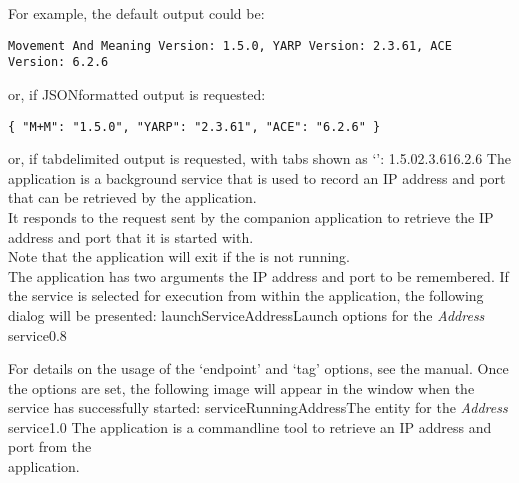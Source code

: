 \insertFullUtilityParameters{}
For example, the default output could be:
\outputBegin
\begin{verbatim}
Movement And Meaning Version: 1.5.0, YARP Version: 2.3.61, ACE Version: 6.2.6
\end{verbatim}
\outputEnd{}
or, if JSON\longDash{}formatted output is requested:
\outputBegin
\begin{verbatim}
{ "M+M": "1.5.0", "YARP": "2.3.61", "ACE": "6.2.6" }
\end{verbatim}
\outputEnd{}
or, if tab\longDash{}delimited output is requested, with tabs shown as `\tabSymbol':
\outputBegin{}
1.5.0\pseudotab{}2.3.61\pseudotab{}6.2.6
\outputEnd
{}
\secondaryEnd
\condPage
{}
The  application is a background service that is used to
record an IP address and port that can be retrieved by the 
application.\\

It responds to the  request sent by the
companion application  to retrieve the IP address and port
that it is started with.\\

Note that the application will exit if the  is not
running.\\

The application has two arguments \longDash{} the IP address and port to be remembered.
\insertAutoAppParameters
{}
\condPage
If the service is selected for execution from within the \emph{\CMU} application, the
following dialog will be presented:
%
{launchServiceAddress}{Launch options for the \emph{Address} service}{0.8}

For details on the usage of the `endpoint' and `tag' options, see the \emph{\CMU} manual.
Once the options are set, the following image will appear in the \emph{\CMU} window when
the service has successfully started:
%
{serviceRunningAddress}{The \emph{\CMU} entity for the \emph{Address} service}{1.0}
\condPage
{}
The  application is a command\longDash{}line tool to
retrieve an IP address and port from the\\
 application.\\

